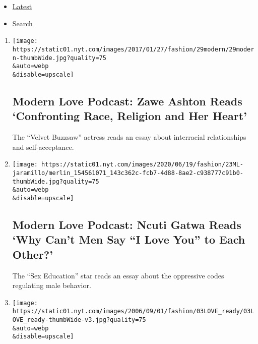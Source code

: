 \begin{itemize}
\tightlist
\item
  \protect\hyperlink{stream-panel}{Latest}
\item
  Search
\end{itemize}

\begin{enumerate}
\def\labelenumi{\arabic{enumi}.}
\item
  \href{/2020/06/24/style/modern-love-podcast-zawe-ashton.html}{}

  \texttt{[image: https://static01.nyt.com/images/2017/01/27/fashion/29modern/29modern-thumbWide.jpg?quality=75\\\&auto=webp\\\&disable=upscale]}

  \hypertarget{modern-love-podcast-zawe-ashton-reads-confronting-race-religion-and-her-heart}{%
  \subsection{Modern Love Podcast: Zawe Ashton Reads `Confronting Race,
  Religion and Her
  Heart'}\label{modern-love-podcast-zawe-ashton-reads-confronting-race-religion-and-her-heart}}

  The ``Velvet Buzzsaw'' actress reads an essay about interracial
  relationships and self-acceptance.
\item
  \href{/2020/06/17/style/modern-love-podcast-ncuti-gatwa.html}{}

  \texttt{[image: https://static01.nyt.com/images/2020/06/19/fashion/23ML-jaramillo/merlin\_154561071\_143c362c-fcb7-4d88-8ae2-c938777c91b0-thumbWide.jpg?quality=75\\\&auto=webp\\\&disable=upscale]}

  \hypertarget{modern-love-podcast-ncuti-gatwa-reads-why-cant-men-say-i-love-you-to-each-other}{%
  \subsection{Modern Love Podcast: Ncuti Gatwa Reads `Why Can't Men Say
  ``I Love You'' to Each
  Other?'}\label{modern-love-podcast-ncuti-gatwa-reads-why-cant-men-say-i-love-you-to-each-other}}

  The ``Sex Education'' star reads an essay about the oppressive codes
  regulating male behavior.
\item
  \href{/2020/06/10/style/modern-love-podcast-lorraine-toussant-updated-poscript.html}{}

  \texttt{[image: https://static01.nyt.com/images/2006/09/01/fashion/03LOVE\_ready/03LOVE\_ready-thumbWide-v3.jpg?quality=75\\\&auto=webp\\\&disable=upscale]}


\end{enumerate}
